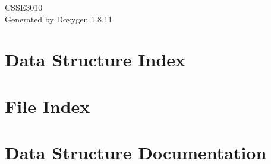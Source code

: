 \documentclass[twoside]{book}
\newcommand{\+}{\discretionary{\mbox{\scriptsize$\hookleftarrow$}}{}{}}
\newcommand{\clearemptydoublepage}{%
  \newpage{\pagestyle{empty}\cleardoublepage}%
}
\begin{document}
\hypersetup{pageanchor=false,
             bookmarksnumbered=true,
             pdfencoding=unicode
            }
\begin{titlepage}
\vspace*{7cm}
\begin{center}%
{\Large C\+S\+S\+E3010 }\\
\vspace*{1cm}
{\large Generated by Doxygen 1.8.11}\\
\end{center}
\end{titlepage}
\clearemptydoublepage
\tableofcontents
\clearemptydoublepage
{}
\hypersetup{pageanchor=true}

\chapter{Data Structure Index}

\chapter{File Index}

\chapter{Data Structure Documentation}




















\end{document}
